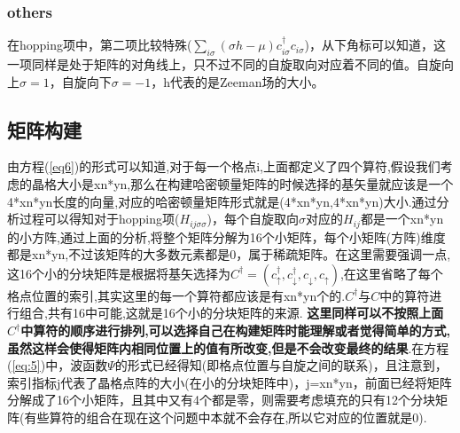 \documentclass[a4paper,12pt]{ctexart}
\numberwithin{equation}{section}
\begin{document}
\subsubsection{others}
在hopping项中，第二项比较特殊($\sum_{i\sigma}(\sigma h-\mu)c_{i\sigma}^\dagger c_{i\sigma}$)，从下角标可以知道，这一项同样是处于矩阵的对角线上，只不过不同的自旋取向对应着不同的值。自旋向上$\sigma=1$，自旋向下$\sigma=-1$，h代表的是Zeeman场的大小。

\subsection{矩阵构建}
由方程(\ref{eq6})的形式可以知道,对于每一个格点i,上面都定义了四个算符,假设我们考虑的晶格大小是xn*yn,那么在构建哈密顿量矩阵的时候选择的基矢量就应该是一个4*xn*yn长度的向量,对应的哈密顿量矩阵形式就是(4*xn*yn,4*xn*yn)大小.通过分析过程可以得知对于hopping项($H_{ij\sigma\sigma}$)，每个自旋取向$\sigma$对应的$H_{ij}$都是一个xn*yn的小方阵,通过上面的分析,将整个矩阵分解为16个小矩阵，每个小矩阵(方阵)维度都是xn*yn,不过该矩阵的大多数元素都是0，属于稀疏矩阵。在这里需要强调一点,这16个小的分块矩阵是根据将基矢选择为$C^\dagger=(c_\uparrow^\dagger,c_\downarrow^\dagger,c_\downarrow,c_\uparrow)$,在这里省略了每个格点位置的索引,其实这里的每一个算符都应该是有xn*yn个的.$C^\dagger$与$C$中的算符进行组合,共有16中可能,这就是16个小的分块矩阵的来源.
\textbf{这里同样可以不按照上面$C^\dagger$中算符的顺序进行排列,可以选择自己在构建矩阵时能理解或者觉得简单的方式,虽然这样会使得矩阵内相同位置上的值有所改变,但是不会改变最终的结果}.在方程(\ref{eq:5})中，波函数$\Psi$的形式已经得知(即格点位置与自旋之间的联系)，且注意到，索引指标j代表了晶格点阵的大小(在小的分块矩阵中)，j=xn*yn，前面已经将矩阵分解成了16个小矩阵，且其中又有4个都是零，则需要考虑填充的只有12个分块矩阵(有些算符的组合在现在这个问题中本就不会存在,所以它对应的位置就是0).
\end{document}

